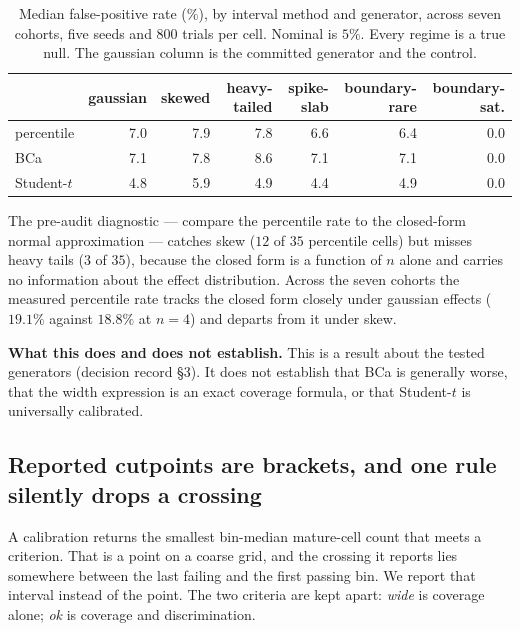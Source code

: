 \begin{table}[h]
\centering
\caption{Median false-positive rate (\%), by interval method and generator,
across seven cohorts, five seeds and 800 trials per cell. Nominal is $5\%$. Every
regime is a true null. The gaussian column is the committed generator and the
control.}
\label{tab:stress}
\begin{tabular}{lrrrrrr}
\toprule
 & gaussian & skewed & heavy-tailed & spike-slab & boundary-rare & boundary-sat. \\
\midrule
percentile  & 7.0 & 7.9 & 7.8 & 6.6 & 6.4 & 0.0 \\
BCa         & 7.1 & 7.8 & 8.6 & 7.1 & 7.1 & 0.0 \\
Student-$t$ & 4.8 & 5.9 & 4.9 & 4.4 & 4.9 & 0.0 \\
\bottomrule
\end{tabular}
\end{table}

The pre-audit diagnostic --- compare the percentile rate to the closed-form
normal approximation --- catches skew ($12$ of $35$ percentile cells) but misses
heavy tails ($3$ of $35$), because the closed form is a function of $n$ alone and
carries no information about the effect distribution. Across the seven cohorts
the measured percentile rate tracks the closed form closely under gaussian
effects ($19.1\%$ against $18.8\%$ at $n=4$) and departs from it under skew.

\textbf{What this does and does not establish.} This is a result about the tested
generators (decision record \S3). It does not establish that BCa is generally
worse, that the width expression is an exact coverage formula, or that
Student-$t$ is universally calibrated.

\subsection{Reported cutpoints are brackets, and one rule silently drops a
crossing}
\label{sec:brackets}

A calibration returns the smallest bin-median mature-cell count that meets a
criterion. That is a point on a coarse grid, and the crossing it reports lies
somewhere between the last failing and the first passing bin. We report that
interval instead of the point. The two criteria are kept apart: \emph{wide} is
coverage alone; \emph{ok} is coverage and discrimination.

